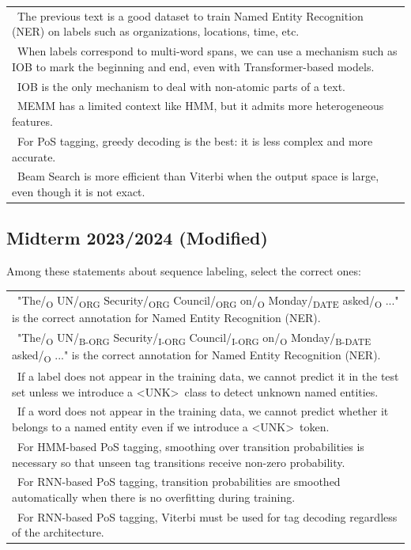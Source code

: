 \documentclass{../extra/aakpract/aakpract}
\begin{document}
	\begin{longtable}{|p{}|}
		\hline 
		\Square\ The previous text is a good dataset to train Named Entity Recognition (NER) on labels such as organizations, locations, time, etc.\\
		\Square\ When labels correspond to multi-word spans, we can use a mechanism such as IOB to mark the beginning and end, even with Transformer-based models.\\
		\Square\ IOB is the only mechanism to deal with non-atomic parts of a text.\\
		\Square\ MEMM has a limited context like HMM, but it admits more heterogeneous features.\\
		\Square\ For PoS tagging, greedy decoding is the best: it is less complex and more accurate.\\
		\Square\ Beam Search is more efficient than Viterbi when the output space is large, even though it is not exact.\\
		\hline
	\end{longtable}
	
	\subsection{Midterm 2023/2024 (Modified)}
	
	Among these statements about sequence labeling, select the correct ones:
	
	\begin{longtable}{|p{}|}
		\hline 
		\Square\ "The/\textsubscript{O} UN/\textsubscript{ORG} Security/\textsubscript{ORG} Council/\textsubscript{ORG} on/\textsubscript{O} Monday/\textsubscript{DATE} asked/\textsubscript{O} ..." is the correct annotation for Named Entity Recognition (NER).\\
		\Square\ "The/\textsubscript{O} UN/\textsubscript{B-ORG} Security/\textsubscript{I-ORG} Council/\textsubscript{I-ORG} on/\textsubscript{O} Monday/\textsubscript{B-DATE} asked/\textsubscript{O} ..." is the correct annotation for Named Entity Recognition (NER).\\
		\Square\ If a label does not appear in the training data, we cannot predict it in the test set unless we introduce a \textless UNK\textgreater\ class to detect unknown named entities.\\
		\Square\ If a word does not appear in the training data, we cannot predict whether it belongs to a named entity even if we introduce a \textless UNK\textgreater\ token.\\
		\Square\ For HMM-based PoS tagging, smoothing over transition probabilities is necessary so that unseen tag transitions receive non-zero probability.\\
		\Square\ For RNN-based PoS tagging, transition probabilities are smoothed automatically when there is no overfitting during training.\\
		\Square\ For RNN-based PoS tagging, Viterbi must be used for tag decoding regardless of the architecture.\\
		\hline
	\end{longtable}
	
\end{document}
